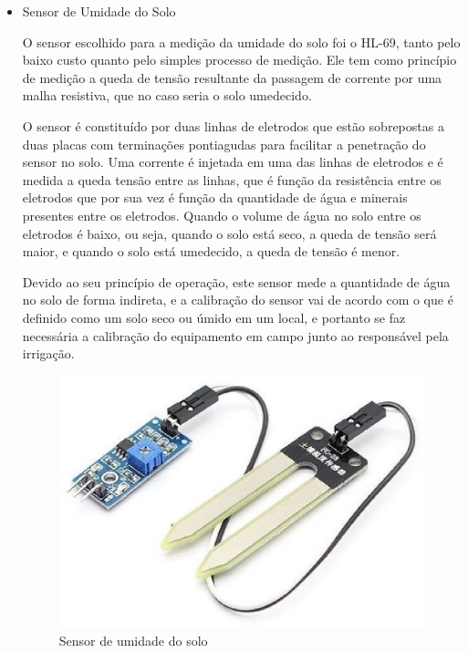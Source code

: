 \begin{itemize}
  \item Sensor de Umidade do Solo

  O sensor escolhido para a medição da umidade do solo foi o HL-69,
  tanto pelo baixo custo quanto pelo simples processo de medição.
  Ele tem como princípio de medição a queda de tensão resultante da
  passagem de corrente por uma malha resistiva, que no caso seria o solo
  umedecido.

  O sensor é constituído por duas linhas de eletrodos que estão
  sobrepostas a duas placas com terminações pontiagudas para facilitar a
  penetração do sensor no solo. Uma corrente é injetada em uma das linhas
  de eletrodos e é medida a queda tensão entre as linhas, que é função da
  resistência entre os eletrodos que por sua vez é função da quantidade de
  água e minerais presentes entre os eletrodos. Quando o volume de água no
   solo entre os eletrodos é baixo, ou seja, quando o solo está seco,
   a queda de tensão será maior, e quando o solo está umedecido,
   a queda de tensão é menor.

  Devido ao seu princípio de operação, este sensor mede a quantidade de
  água no solo de forma indireta, e a calibração do sensor vai de acordo
  com o que é definido como um solo seco ou úmido em um local, e portanto
  se faz necessária a calibração do equipamento em campo junto ao
  responsável pela irrigação.

  \begin{figure}[!htbp]
  \begin{center}
  \includegraphics[keepaspectratio=true,scale=0.3]{figuras/higrometer.eps}
  \caption{\label{DHT11}Sensor de umidade do solo}
  \end{center}
  \end{figure}


\end{itemize}

